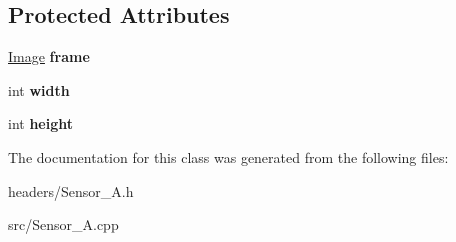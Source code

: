 \subsection*{Protected Attributes}
\begin{DoxyCompactItemize}
\item 
\hypertarget{class_sensor___a_a8c4e3132f812134c2fab40b9bd007fc5}{\hyperlink{class_image}{Image} {\bfseries frame}}\label{class_sensor___a_a8c4e3132f812134c2fab40b9bd007fc5}

\item 
\hypertarget{class_sensor___a_adf0ce618dfa6097c2d6455e03689c6ae}{int {\bfseries width}}\label{class_sensor___a_adf0ce618dfa6097c2d6455e03689c6ae}

\item 
\hypertarget{class_sensor___a_ae83538c39c359545c197c997596b7291}{int {\bfseries height}}\label{class_sensor___a_ae83538c39c359545c197c997596b7291}

\end{DoxyCompactItemize}


The documentation for this class was generated from the following files\-:\begin{DoxyCompactItemize}
\item 
headers/Sensor\-\_\-\-A.\-h\item 
src/Sensor\-\_\-\-A.\-cpp\end{DoxyCompactItemize}
